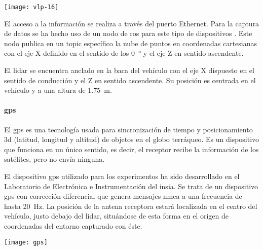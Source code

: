\begin{marginfigure}
	\texttt{[image: vlp-16]}
	\caption{El \ac{lidar} VLP-16 de Velodyne tiene un FOV horizontal de \SI{360}{\degree} y vertical de \SI{\pm15}{\degree}, permitiendo una captura de todo el entorno circundante a una frecuencia de hasta \SI{20}{\Hz}. Fuente: \url{http://velodynelidar.com/vlp-16.html}.}
	\label{fig:vlp-16}
\end{marginfigure}

El acceso a la información se realiza a través del puerto Ethernet. Para la captura de datos se ha hecho uso de un nodo de \ac{ros} para este tipo de dispositivos . Este nodo publica en un topic específico la nube de puntos en coordenadas cartesianas con el eje X definido en el sentido de los \SI{0}{\degree} y el eje Z en sentido ascendente.

El \ac{lidar} se encuentra anclado en la baca del vehículo con el eje X dispuesto en el sentido de conducción y el Z en sentido ascendente. Su posición es centrada en el vehículo y a una altura de \SI{1.75}{\meter}.

\paragraph{\ac{gps}}

El \ac{gps} es una tecnología usada para sincronización de tiempo y posicionamiento 3d (latitud, longitud y altitud) de objetos en el globo terráqueo. Es un dispositivo que funciona en un único sentido, es decir, el receptor recibe la información de los satélites, pero no envía ninguna.

El dispositivo \ac{gps} utilizado para los experimentos ha sido desarrollado en el Laboratorio de Electrónica e Instrumentación del \ac{insia}. Se trata de un dispositivo \ac{gps} con corrección diferencial que genera mensajes \ac{nmea} a una frecuencia de hasta \SI{20}{\Hz}. La posición de la antena receptora estará localizada en el centro del vehículo, justo debajo del \ac{lidar}, situándose de esta forma en el origen de coordenadas del entorno capturado con éste.

\begin{marginfigure}
	\centering
	\texttt{[image: gps]}
	\caption{El \ac{gps} permite el posicionamiento 3d sobre en la tierra gracias a la comunicación unidireccional de satélites situados en órbita. Fuente: Wikimedia Commons.}
	\label{fig:gps}
\end{marginfigure}

